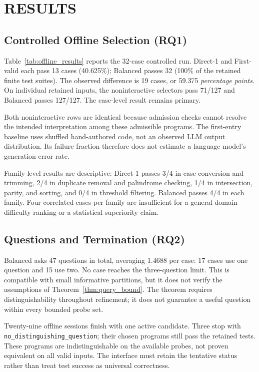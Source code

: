 \section{RESULTS}\label{sec:results}
\subsection{Controlled Offline Selection (RQ1)}
Table~\ref{tab:offline_results} reports the 32-case controlled run. Direct-1 and First-valid each pass 13 cases (40.625\%); Balanced passes 32 (100\% of the retained finite test suites). The observed difference is 19 cases, or 59.375 \emph{percentage points}. On individual retained inputs, the noninteractive selectors pass 71/127 and Balanced passes 127/127. The case-level result remains primary.


Both noninteractive rows are identical because admission checks cannot resolve the intended interpretation among these admissible programs. The first-entry baseline uses shuffled hand-authored code, not an observed LLM output distribution. Its failure fraction therefore does not estimate a language model's generation error rate.

Family-level results are descriptive: Direct-1 passes 3/4 in case conversion and trimming, 2/4 in duplicate removal and palindrome checking, 1/4 in intersection, parity, and sorting, and 0/4 in threshold filtering. Balanced passes 4/4 in each family. Four correlated cases per family are insufficient for a general domain-difficulty ranking or a statistical superiority claim.

\subsection{Questions and Termination (RQ2)}
Balanced asks 47 questions in total, averaging 1.4688 per case: 17 cases use one question and 15 use two. No case reaches the three-question limit. This is compatible with small informative partitions, but it does not verify the assumptions of Theorem~\ref{thm:query_bound}. The theorem requires distinguishability throughout refinement; it does not guarantee a useful question within every bounded probe set.


Twenty-nine offline sessions finish with one active candidate. Three stop with \texttt{no\_distinguishing\_question}; their chosen programs still pass the retained tests. These programs are indistinguishable on the available probes, not proven equivalent on all valid inputs. The interface must retain the tentative status rather than treat test success as universal correctness.

